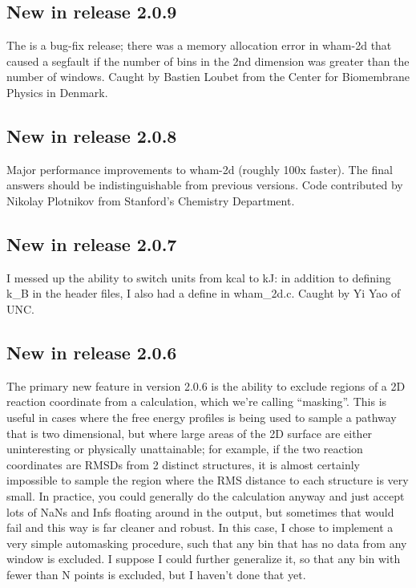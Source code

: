 \documentclass[12pt]{article}
\begin{document}
\subsection{New in release 2.0.9}

The is a bug-fix release; there was a memory allocation error in wham-2d
that caused a segfault if the number of bins in the 2nd dimension was
greater than the number of windows.  Caught by Bastien Loubet from the
Center for Biomembrane Physics in Denmark.

\subsection{New in release 2.0.8}

Major performance improvements to wham-2d (roughly 100x faster).  The final
answers should be indistinguishable from previous versions.  Code
contributed by Nikolay Plotnikov from Stanford's Chemistry Department.

\subsection{New in release 2.0.7}

I messed up the ability to switch units from kcal to kJ: in addition to
defining k\_B in the header files, I also had a define in wham\_2d.c.  Caught
by Yi Yao of UNC.

\subsection{New in release 2.0.6}

The primary new feature in version 2.0.6 is the ability to exclude regions of a
2D reaction coordinate from a calculation, which we're calling ``masking''.
This is useful in cases where the free energy profiles is being used to sample a
pathway that is two dimensional, but where large areas of the 2D surface are
either uninteresting or physically unattainable; for example, if the two
reaction coordinates are RMSDs from 2 distinct structures, it is almost
certainly impossible to sample the region where the RMS distance to each
structure is very small.  In practice, you could generally do the calculation
anyway and just accept lots of NaNs and Infs floating around in the output, but
sometimes that would fail and this way is far cleaner and robust.  In this case,
I chose to implement a very simple automasking procedure, such that any bin that
has no data from any window is excluded.  I suppose I could further generalize
it, so that any bin with fewer than N points is excluded, but I haven't done
that yet.
\end{document}
